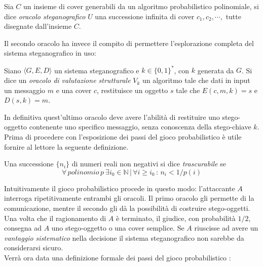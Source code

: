 		\begin{defn} Sia $C$ un insieme di cover generabili da un algoritmo probabilistico polinomiale, si dice \textit{oracolo steganografico} $U$ una successione infinita di cover $c_1, c_2, \cdots, $ tutte disegnate dall'insieme $C$.
	\end{defn} 
	\noindent Il secondo oracolo ha invece il compito di permettere l'esplorazione completa del sistema steganografico in uso:
			\begin{defn} Siano $\langle G, E, D \rangle$ un sistema steganografico e $k \in \lbrace 0,1 \rbrace ^*$, con $k$ generata da $G$. Si dice un \textit{oracolo di valutazione strutturale} $V_k$ un algoritmo tale che dati in input un messaggio $m$ e una cover $c$, restituisce un oggetto $s$ tale che $E(c, m, k) = s$ e $D(s, k) = m$.
	\end{defn}  
	\noindent In definitiva quest'ultimo oracolo deve avere l'abilità di restituire uno stego-oggetto contenente uno specifico messaggio, senza conoscenza della stego-chiave $k$.\\ Prima di procedere con l'esposizione dei passi del gioco probabilistico è utile fornire al lettore la seguente definizione.
	\begin{defn}
	\label{trascurabile}
	Una successione $\lbrace n_i \rbrace$ di numeri reali non negativi si dice \textit{trascurabile} se 
	\[\forall \, \mathit{polinomio} \, p \: \exists i_0 \in \mathbb{N} \, \vert \, \forall i \geq i_0 \, : \, n_i < 1/p(i) \]
	\end{defn}
	\noindent Intuitivamente il gioco probabilistico procede in questo modo: l'attaccante $A$ interroga ripetitivamente entrambi gli oracoli. Il primo oracolo gli permette di  la comunicazione, mentre il secondo gli dà la possibilità di costruire stego-oggetti. Una volta che il ragionamento di $A$ è terminato, il giudice, con probabilità $1/2$, consegna ad $A$ uno stego-oggetto o una cover semplice. Se $A$ riuscisse ad avere un \textit{vantaggio sistematico} nella decisione il sistema steganografico non sarebbe da considerarsi sicuro.\\ Verrà ora data una definizione formale dei passi del gioco probabilistico : 
